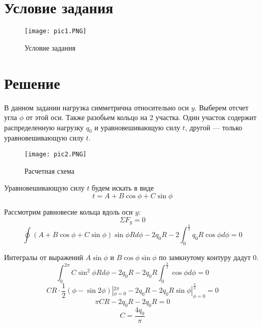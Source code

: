 \section{Условие задания}

\begin{figure}[H]
    \begin{center}
        \texttt{[image: pic1.PNG]}
        \caption{Условие задания}
        \label{pic1}
    \end{center} 
\end{figure}

\section{Решение}

В данном задании нагрузка симметрична относительно оси $y$. Выберем отсчет угла $\phi$ от этой оси. Также разобьем кольцо на 2 участка. Один участок содержит распределенную нагрузку $q_0$ и уравновешивающую силу $t$, другой --- только уравновешивающую силу $t$.

\begin{figure}[H]
    \begin{center}
        \texttt{[image: pic2.PNG]}
        \caption{Расчетная схема}
        \label{pic2}
    \end{center}
\end{figure}

Уравновешивающую силу $t$ будем искать в виде 
\begin{equation}
    \label{eq1}
    t = A + B \cos \phi + C \sin \phi
\end{equation}

Рассмотрим равновесие кольца вдоль оси $y$:
\begin{equation}
    \label{eq2}
    \Sigma F_y = 0
\end{equation}
\begin{equation}
    \label{eq3}
    \oint (A + B \cos \phi + C \sin \phi) \sin \phi R d \phi - 2q_0R - 2 \int_{0}^{\frac{\pi}{2}} {q_0R \cos \phi d \phi} = 0
\end{equation}

Интегралы от выражений $A \sin \phi$ и $B \cos \phi \sin \phi$ по замкнутому контуру дадут 0.
\begin{equation}
    \label{eq4}
    \int_{0}^{2 \pi}{C \sin^2 \phi R d \phi} - 2q_0R - 2q_0R \int_{0}^{\frac{\pi}{2}}{\cos \phi d \phi} = 0
\end{equation}
\begin{equation}
    \label{eq5}
    CR \cdot \frac{1}{2}(\phi - \sin 2 \phi) |_{\phi=0}^{2 \pi} - 2q_0R - 2q_0R \sin \phi |_{\phi = 0}^{\frac{\pi}{2}} = 0
\end{equation}
\begin{equation}
    \label{eq6}
    \pi CR - 2q_0R - 2q_0R = 0
\end{equation}
\begin{equation}
    \label{eq7}
    C = \frac{4q_0}{\pi}
\end{equation}

